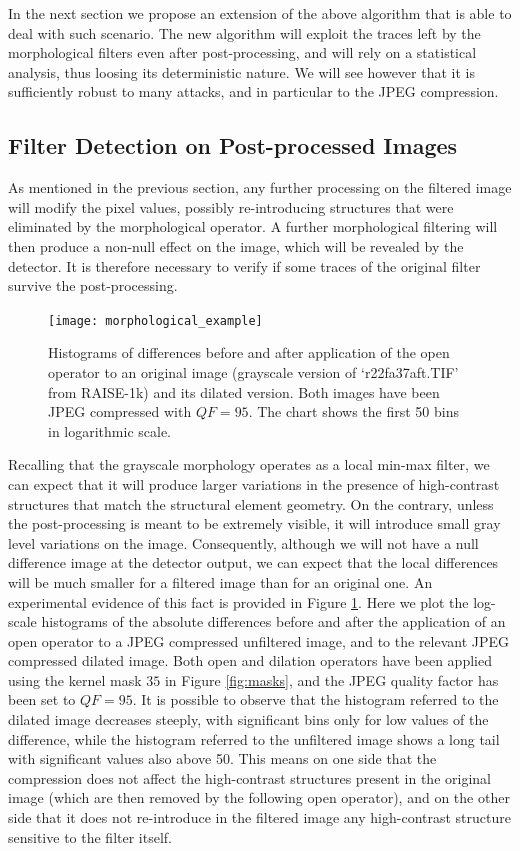 \documentclass{ieeeaccess}
\begin{document}
In the next section we propose an extension of the above algorithm that is able to deal with such scenario. The new algorithm will exploit the traces left by the morphological filters even after post-processing, and will rely on a statistical analysis, thus loosing its deterministic nature. We will see however that it is sufficiently robust to many attacks, and in particular to the JPEG compression.

\subsection{Filter Detection on Post-processed Images}
As mentioned in the previous section, any further processing on the filtered image will modify the pixel values, possibly re-introducing structures that were eliminated by the morphological operator. A further morphological filtering will then produce a non-null effect on the image, which will be revealed by the detector. It is therefore necessary to verify if some traces of the original filter survive the post-processing.
\begin{figure}[!ht]%
	\centering
	\texttt{[image: morphological\_example]}
	\caption{Histograms of differences before and after application of the open operator to an original image (grayscale version of `r22fa37aft.TIF' from RAISE-1k) and its dilated version. Both images have been JPEG compressed with $QF = 95$. The chart shows the first 50 bins in logarithmic scale. }
	\label{fig:differerence_histogram}
\end{figure}

Recalling that the grayscale morphology operates as a local min-max filter, we can expect that it will produce larger variations in the presence of high-contrast structures that match the structural element geometry. On the contrary, unless the post-processing is meant to be extremely visible, it will introduce small gray level variations on the image. Consequently, although we will not have a null difference image at the detector output, we can expect that the local differences will be much smaller for a filtered image than for an original one. An experimental evidence of this fact is provided in Figure \ref{fig:differerence_histogram}. Here we plot the log-scale histograms of the absolute differences before and after the application of an open operator to a JPEG compressed unfiltered image, and to the relevant JPEG compressed dilated image. Both open and dilation operators have been applied using the kernel mask $35$ in Figure \ref{fig:masks}, and the JPEG quality factor has been set to $QF=95$. It is possible to observe that the histogram referred to the dilated image decreases steeply, with significant bins only for low values of the difference, while the histogram referred to the unfiltered image shows a long tail with significant values also above 50. This means on one side that the compression does not affect the high-contrast structures present in the original image (which are then removed by the following open operator), and on the other side that it does not re-introduce in the filtered image any high-contrast structure sensitive to the filter itself.
\end{document}
